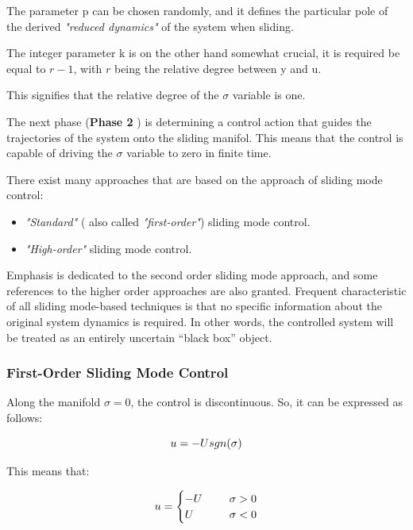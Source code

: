 \documentclass{thesisreport}
\begin{document}
\noindent The parameter p can be chosen randomly, and it defines the particular pole of the derived \textit{"reduced dynamics"} of the system when sliding.
 

\noindent The integer parameter k is on the other hand somewhat crucial, it is required be equal to $r-1$, with $r$ being the relative
degree between y and u.


\noindent This signifies that the relative degree of the $\sigma$ variable is one.


\noindent The next phase (\textbf{Phase 2 }) is determining a control action that guides the trajectories of the system onto the sliding manifol. This means that the control is capable of driving the $\sigma$ variable to zero in finite time.


\noindent There exist many approaches that are based on the approach of sliding mode control:

\begin{itemize}
	\item \textit{"Standard"} ( also called \textit{"first-order"}) sliding mode control.
	\item \textit{"High-order"} sliding mode control.
\end{itemize}


Emphasis is dedicated to the second order sliding mode approach, and some references to the higher order approaches
are also granted. Frequent characteristic of all sliding mode-based techniques is that no specific information about the
original system dynamics is required. In other words, the controlled system will be treated as an entirely uncertain “black box” object.

\newpage

\subsubsection{First-Order Sliding Mode Control}


Along the manifold $\sigma=0$, the control is discontinuous. So, it can be expressed as follows:

\begin{equation}
	u = -U \space sgn(\sigma)
\end{equation}


This means that:

\begin{equation}
\begin{aligned}
	u = \begin{cases}
		-U \hspace{0.5cm} &\sigma>0 \\
		U \hspace{0.5cm}  &\sigma<0
	\end{cases}
\end{aligned}
\end{equation}
\end{document}
